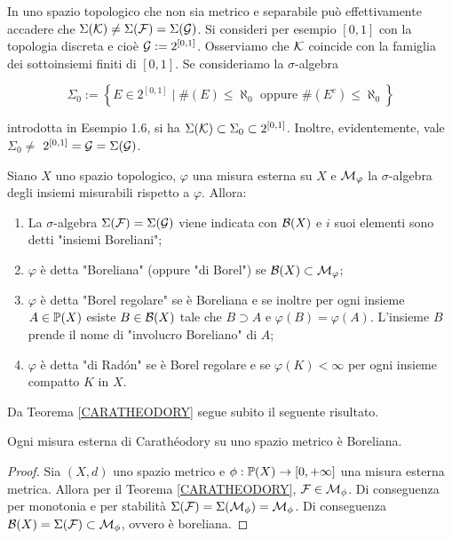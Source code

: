 \begin{remark}In uno spazio topologico che non sia metrico e separabile può effettivamente accadere che $\Sigma(\mc{K}) \neq \Sigma(\mc{F})=\Sigma(\mc{G})$. Si consideri per esempio $[0,1]$ con la topologia discreta e cioè $\mc{G}:=2^{[0,1]}$. Osserviamo che $\mc{K}$ coincide con la famiglia dei sottoinsiemi finiti di $[0,1]$. Se consideriamo la $\sigma$-algebra

$$
\Sigma_{0}:=\left\{E \in 2^{[0,1]} \mid \#(E) \leq \aleph_{0} \text { oppure } \#\left(E^{c}\right) \leq \aleph_{0}\right\}
$$

introdotta in Esempio 1.6, si ha $\Sigma(\mc{K}) \subset \Sigma_{0} \subset 2^{[0,1]}$. Inoltre, evidentemente, vale $\Sigma_{0} \neq$ $2^{[0,1]}=\mc{G}=\Sigma(\mc{G})$.
\end{remark}
\begin{definition}
  Siano $X$ uno spazio topologico, $\varphi$ una misura esterna su $X$ e $\mc{M}_{\varphi}$ la $\sigma$-algebra degli insiemi misurabili rispetto a $\varphi$. Allora:
  \begin{enumerate}[label=$(\roman*)$]
    \item La $\sigma$-algebra $\Sigma(\mc{F})=\Sigma(\mc{G})$ viene indicata con $\mc{B}(X)$ e $i$ suoi elementi sono detti "insiemi Boreliani";
    \item $\varphi$ è detta "Boreliana" (oppure "di Borel") se $\mc{B}(X) \subset \mc{M}_{\varphi}$;
    \item $\varphi$ è detta "Borel regolare" se è Boreliana e se inoltre per ogni insieme $A \in \P(X)$ esiste $B \in \mc{B}(X)$ tale che $B \supset A$ e $\varphi(B)=\varphi(A)$. L'insieme $B$ prende il nome di "involucro Boreliano" di $A$;
    \item $\varphi$ è detta "di Radón" se è Borel regolare e se $\varphi(K)<\infty$ per ogni insieme compatto $K$ in $X$.
  \end{enumerate}
\end{definition}

Da Teorema \ref{CARATHEODORY} segue subito il seguente risultato.

\begin{corollary}[$\circ$] Ogni misura esterna di Carathéodory su uno spazio metrico è Boreliana.
\end{corollary}
\begin{proof}
  Sia $(X,d)$ uno spazio metrico e $\phi: \P(X)\to [0,+\infty]$ una misura esterna metrica. Allora per il Teorema \ref{CARATHEODORY}, $\mc{F}\in \mc M_\phi$. Di conseguenza per monotonia e per stabilità $\Sigma(\mc{F})=\Sigma(\mc M_\phi)=\mc M_\phi$. Di conseguenza $\mc{B}(X)=\Sigma(\mc{F})\subset \mc M_\phi$, ovvero è boreliana.
\end{proof}


